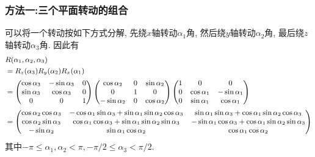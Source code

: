 \documentclass[UTF8]{ctexart}
\begin{document}
\subsubsection{方法一:三个平面转动的组合}
可以将一个转动按如下方式分解, 先绕$x$轴转动$\alpha_1$角, 然后绕$y$轴转动$\alpha_2$角, 最后绕$z$轴转动$\alpha_3$角. 因此有
\begin{equation}\small
  \begin{split}
    &R(\alpha_1, \alpha_2, \alpha_3)\\
    &= R_z(\alpha_3) R_y (\alpha_2) R_x (\alpha_1) \\
    & =
    \begin{pmatrix}
      \cos \alpha_3 & - \sin \alpha_3 & 0 \\
      \sin \alpha_3 & \cos \alpha_3 & 0 \\
      0 & 0 & 1
    \end{pmatrix}
    \begin{pmatrix}
      \cos \alpha_2 & 0 & \sin \alpha_2 \\
      0 & 1 & 0 \\
      - \sin \alpha_2 & 0 & \cos \alpha_2
    \end{pmatrix}
    \begin{pmatrix}
      1 & 0 & 0 \\
      0 & \cos \alpha_1 & -\sin \alpha_1 \\
      0 & \sin \alpha_1 & \cos \alpha_1
    \end{pmatrix} \\
    &=
    \begin{pmatrix}
      \cos\alpha_2\cos\alpha_3 & -\cos\alpha_1\sin\alpha_3+\sin\alpha_1\sin\alpha_2\cos\alpha_3 & \sin\alpha_1\sin\alpha_3+\cos\alpha_1\sin\alpha_2\cos\alpha_3 \\
      \cos\alpha_2\sin\alpha_3 & \cos\alpha_1\cos\alpha_3+\sin\alpha_1\sin\alpha_2\sin\alpha_3 & -\sin\alpha_1\cos\alpha_3+\cos\alpha_1\sin\alpha_2\sin\alpha_3 \\
      -\sin\alpha_2 & \sin\alpha_1\cos\alpha_2 & \cos\alpha_1\cos\alpha_2
    \end{pmatrix}
  \end{split}
\end{equation}
其中$-\pi \leq \alpha_1, \alpha_2 < \pi, -\pi / 2 \leq \alpha_3 < \pi /2$.
\end{document}
